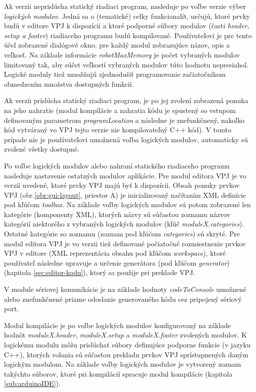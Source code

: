 Ak verzii neprislúcha statický riadiaci program, nasleduje po voľbe verzie výber \textit{logických modulov}. Jedná sa o (tematické) celky funkcionalít, určujú, ktoré prvky budú v editore VPJ k dispozícii a ktoré podporné súbory modulov (časti \textit{header, setup a footer}) riadiaceho programu budú kompilované. Používateľovi je pre tento účel zobrazené dialógové okno, pre každý modul zobrazujúce názov, opis a veľkosť. Na základe informácie \textit{robotMaxMemory} je počet vybraných modulov limitovaný tak, aby súčet veľkostí vybraných modulov túto hodnotu nepresiahol. Logické moduly tiež umožňujú zjednodušiť programovanie začiatočníkom obmedzením množstva dostupných funkcií.

Ak verzii prislúcha statický riadiaci program, je po jej zvolení zobrazená ponuka na jeho nahratie (modul kompilácie a nahratia kódu je spustený so vstupom definovaným parametrom \textit{programLocation} a následne je znefunkčnený, nakoľko kód vytváraný vo VPJ tejto verzie nie kompilovateľný C++ kód). V tomto prípade nie je používateľovi umožnená voľba logických modulov, automaticky sú zvolené všetky dostupné.

Po voľbe logických modulov alebo nahraní statického riadiaceho programu nasleduje nastavenie ostatných modulov aplikácie. Pre modul editora VPJ je vo verzii uvedené, ktoré prvky VPJ majú byť k dispozícii. Obsah ponuky prvkov VPJ (obr.\ref{obr:gui-layout}, priestor A) je inicializovaný načítaním XML definície pod kľúčom \textit{toolbox}. Na základe voľby logických modulov sú potom zobrazené len kategórie (komponenty XML), ktorých názvy sú súčasťou zoznamu názvov kategórií niektorého z vybraných logických modulov (kľúč \textit{moduleX.categories}). Ostatné kategórie zo zoznamu (zoznam pod kľúčom \textit{categories}) sú skryté. Pre modul editora VPJ je vo verzii tiež definované počiatočné rozmiestnenie prvkov VPJ v editore (XML reprezentácia obsahu pod kľúčom \textit{workspace}), ktoré používateľ následne upravuje a určenie generátora (pod kľúčom \textit{generator}) (kapitola \ref{sec:editor-kodu}), ktorý sa použije pri preklade VPJ.

V module sériovej komunikácie je na základe hodnoty \textit{codeToConsole} umožnené alebo znefunkčnené priame odoslanie generovaného kódu cez pripojený sériový port.

Modul kompilácie je po voľbe logických modulov konfigurovaný na základe hodnôt \textit{moduleX.header}, \textit{moduleX.setup} a \textit{moduleX.footer} zvolených modulov. K logickému modulu môžu prislúchať súbory definujúce podporne funkcie (v jazyku C++), ktorých volania sú súčasťou prekladu prvkov VPJ sprístupnených daným logickým modulom. Na základe voľby logických modulov je vytvorený zoznam takýchto súborov, ktoré pri kompilácií spracuje modul kompilácie (kapitola \ref{sub:arduinoIDE}).

